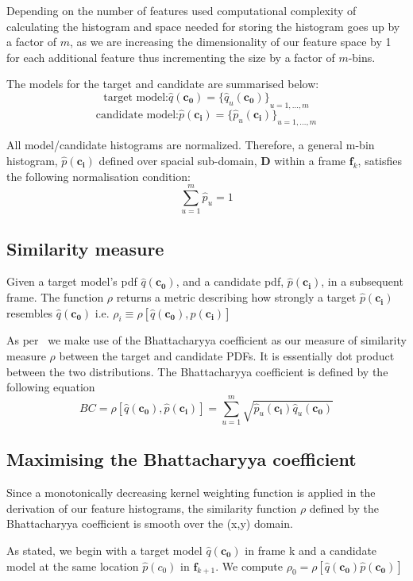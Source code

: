 Depending on the number of features used computational complexity of calculating
the histogram and space needed for storing the histogram goes up by a factor of
$m$, as we are increasing the dimensionality of our feature space by 1 for each
additional feature thus incrementing the size by a factor of $m$-bins.

The models for the target and candidate are summarised below:
\[\text{target model:}\hat{q}(\mathbf{c_0}) = {\{\hat{q}_u(\mathbf{c_0})\}}_{u=1,\ldots,m}\]
\[\text{candidate model:}\hat{p}(\mathbf{c_i}) = {\{\hat{p}_u(\mathbf{c_i})\}}_{u=1,\ldots,m}\]

All model/candidate histograms are normalized. Therefore, a general m-bin
histogram, $\hat{p}(\mathbf{c_i})$ defined over spacial sub-domain, $\mathbf{D}$
within a frame $\mathbf{f}_k$, satisfies the following normalisation condition:
\[\sum_{u=1}^{m}\hat{p}_u = 1\]

\subsection{Similarity measure}
Given a target model's pdf $\hat{q}(\mathbf{c_0})$, and a candidate pdf,
$\hat{p}(\mathbf{c_i})$, in a subsequent frame.  The function $\rho$ returns a
metric describing how strongly a target $\hat{p}(\mathbf{c_i})$ resembles
$\hat{q}(\mathbf{c_0})$ i.e.
$\rho_i \equiv \rho[\hat{q}(\mathbf{c_0}),\hat{p}(\mathbf{c_i})]$

As per~\cite{Comaniciu2003} we make use of the Bhattacharyya coefficient as our
measure of similarity measure $\rho$ between the target and candidate PDFs. It
is essentially dot product between the two distributions. The
Bhattacharyya coefficient is defined by the following equation
\begin{equation}\label{eqn:bhattacharyya}
    BC = \rho[\hat{q}(\mathbf{c_0}),\hat{p}(\mathbf{c_i})]=\sum_{u=1}^{m}\sqrt{\hat{p}_u(\mathbf{c_i})\hat{q}_u(\mathbf{c_0})}
\end{equation}

\subsection{Maximising the Bhattacharyya coefficient}\label{maximising_bhat}
Since a monotonically decreasing kernel weighting function is applied in the
derivation of our feature histograms, the similarity function $\rho$ defined by the
Bhattacharyya coefficient is smooth over the (x,y) domain.

As stated, we begin with a target model $\hat{q}(\mathbf{c_0})$ in frame k and a candidate
model at the same location $\hat{p}(c_0)$ in $\mathbf{f}_{k+1}$. We compute
$\rho_0=\rho[\hat{q}(\mathbf{c_0})\hat{p}(\mathbf{c_0})]$ 

